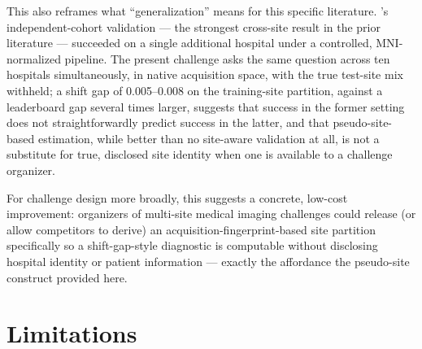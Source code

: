 \documentclass[11pt]{article}
\begin{document}
This also reframes what ``generalization'' means for this specific literature. \citet{choi2017}'s independent-cohort validation --- the strongest cross-site result in the prior literature --- succeeded on a single additional hospital under a controlled, MNI-normalized pipeline. The present challenge asks the same question across ten hospitals simultaneously, in native acquisition space, with the true test-site mix withheld; a shift gap of 0.005--0.008 on the training-site partition, against a leaderboard gap several times larger, suggests that success in the former setting does not straightforwardly predict success in the latter, and that pseudo-site-based estimation, while better than no site-aware validation at all, is not a substitute for true, disclosed site identity when one is available to a challenge organizer.

For challenge design more broadly, this suggests a concrete, low-cost improvement: organizers of multi-site medical imaging challenges could release (or allow competitors to derive) an acquisition-fingerprint-based site partition specifically so a shift-gap-style diagnostic is computable without disclosing hospital identity or patient information --- exactly the affordance the pseudo-site construct provided here.

\section{Limitations}
\label{sec:limitations}
\end{document}
